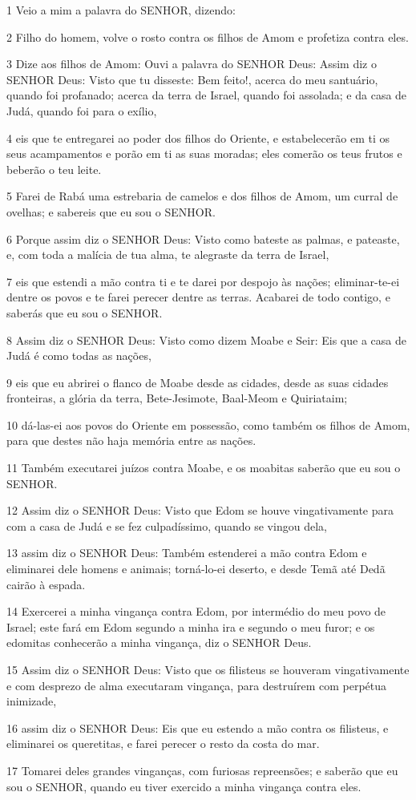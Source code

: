 \par 1 Veio a mim a palavra do SENHOR, dizendo:
\par 2 Filho do homem, volve o rosto contra os filhos de Amom e profetiza contra eles.
\par 3 Dize aos filhos de Amom: Ouvi a palavra do SENHOR Deus: Assim diz o SENHOR Deus: Visto que tu disseste: Bem feito!, acerca do meu santuário, quando foi profanado; acerca da terra de Israel, quando foi assolada; e da casa de Judá, quando foi para o exílio,
\par 4 eis que te entregarei ao poder dos filhos do Oriente, e estabelecerão em ti os seus acampamentos e porão em ti as suas moradas; eles comerão os teus frutos e beberão o teu leite.
\par 5 Farei de Rabá uma estrebaria de camelos e dos filhos de Amom, um curral de ovelhas; e sabereis que eu sou o SENHOR.
\par 6 Porque assim diz o SENHOR Deus: Visto como bateste as palmas, e pateaste, e, com toda a malícia de tua alma, te alegraste da terra de Israel,
\par 7 eis que estendi a mão contra ti e te darei por despojo às nações; eliminar-te-ei dentre os povos e te farei perecer dentre as terras. Acabarei de todo contigo, e saberás que eu sou o SENHOR.
\par 8 Assim diz o SENHOR Deus: Visto como dizem Moabe e Seir: Eis que a casa de Judá é como todas as nações,
\par 9 eis que eu abrirei o flanco de Moabe desde as cidades, desde as suas cidades fronteiras, a glória da terra, Bete-Jesimote, Baal-Meom e Quiriataim;
\par 10 dá-las-ei aos povos do Oriente em possessão, como também os filhos de Amom, para que destes não haja memória entre as nações.
\par 11 Também executarei juízos contra Moabe, e os moabitas saberão que eu sou o SENHOR.
\par 12 Assim diz o SENHOR Deus: Visto que Edom se houve vingativamente para com a casa de Judá e se fez culpadíssimo, quando se vingou dela,
\par 13 assim diz o SENHOR Deus: Também estenderei a mão contra Edom e eliminarei dele homens e animais; torná-lo-ei deserto, e desde Temã até Dedã cairão à espada.
\par 14 Exercerei a minha vingança contra Edom, por intermédio do meu povo de Israel; este fará em Edom segundo a minha ira e segundo o meu furor; e os edomitas conhecerão a minha vingança, diz o SENHOR Deus.
\par 15 Assim diz o SENHOR Deus: Visto que os filisteus se houveram vingativamente e com desprezo de alma executaram vingança, para destruírem com perpétua inimizade,
\par 16 assim diz o SENHOR Deus: Eis que eu estendo a mão contra os filisteus, e eliminarei os queretitas, e farei perecer o resto da costa do mar.
\par 17 Tomarei deles grandes vinganças, com furiosas repreensões; e saberão que eu sou o SENHOR, quando eu tiver exercido a minha vingança contra eles.


